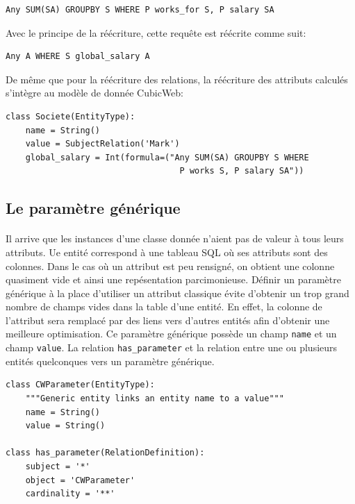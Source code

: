 \documentclass {report}
\begin{document}
\renewcommand{\lstlistingname}{Requête}
\begin{lstlisting}[caption= Sélection de la somme des salaires]
Any SUM(SA) GROUPBY S WHERE P works_for S, P salary SA
\end{lstlisting}

Avec le principe de la réécriture, cette requête est réécrite comme suit:
\renewcommand{\lstlistingname}{Requête avec réécriture}
\begin{lstlisting}[caption= Sélectionne de la somme des salaires]
Any A WHERE S global_salary A
\end{lstlisting}

De même que pour la réécriture des relations, la réécriture des attributs calculés s'intègre au modèle de donnée CubicWeb:
\renewcommand{\lstlistingname}{Schéma}
\begin{lstlisting}[caption= Entité contenant un attribut calculé]
class Societe(EntityType):
    name = String()
    value = SubjectRelation('Mark')
    global_salary = Int(formula=("Any SUM(SA) GROUPBY S WHERE 
                                   P works S, P salary SA"))
\end{lstlisting}

\subsection{Le paramètre générique}
\paragraph{}
Il arrive que les instances d'une classe donnée n'aient pas de valeur à tous leurs attributs. Ue entité correspond à une tableau SQL où ses attributs sont des colonnes. Dans le cas où un attribut est peu rensigné, on obtient une colonne quasiment vide et ainsi une repésentation parcimonieuse. Définir un paramètre générique à la place d'utiliser un attribut classique évite d'obtenir un trop grand nombre de champs vides dans la table d'une entité. En effet, la colonne de l'attribut sera remplacé par des liens vers d'autres entités afin d'obtenir une meilleure optimisation. Ce paramètre générique possède un champ \verb+name+ et un champ \verb+value+. La relation \verb+has_parameter+ et la relation entre une ou plusieurs entités quelconques vers un paramètre générique.


\begin{lstlisting}[caption= Paramètre générique]
class CWParameter(EntityType):
    """Generic entity links an entity name to a value"""
    name = String()
    value = String()

class has_parameter(RelationDefinition):
    subject = '*'
    object = 'CWParameter'
    cardinality = '**'
\end{lstlisting}
\end{document}
